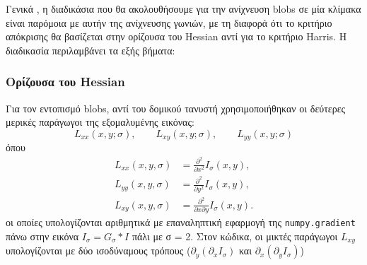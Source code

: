 \documentclass[12pt, a4paper]{article}
\begin{document}
Γενικά , η διαδικάσια που θα ακολουθήσουμε για την ανίχνευση blobs σε μία κλίμακα είναι παρόμοια με αυτήν της ανίχνευσης γωνιών, με τη διαφορά ότι το κριτήριο απόκρισης θα βασίζεται στην ορίζουσα του Hessian αντί για το κριτήριο Harris. Η διαδικασία περιλαμβάνει τα εξής βήματα:
\subsubsection{Ορίζουσα του Hessian}

Για τον εντοπισμό blobs, αντί του δομικού τανυστή χρησιμοποιήθηκαν οι δεύτερες
μερικές παράγωγοι της εξομαλυμένης εικόνας:
\begin{equation}
    L_{xx}(x,y;\sigma), \qquad
    L_{xy}(x,y;\sigma), \qquad
    L_{yy}(x,y;\sigma)
\end{equation} 
όπου \begin{equation}                                                                                                                                                            
  \begin{aligned}                                                                                                                                                             
  L_{xx}(x,y,\sigma) &= \frac{\partial^2}{\partial x^2} I_\sigma(x,y), \\                                                                                                     
  L_{yy}(x,y,\sigma) &= \frac{\partial^2}{\partial y^2} I_\sigma(x,y), \\                                                                                                     
  L_{xy}(x,y,\sigma) &= \frac{\partial^2}{\partial x \partial y} I_\sigma(x,y).                                                                                               
  \end{aligned}                                                                                                                                                               
  \label{eq:hessian_second_derivatives}                                                                                                                                       
  \end{equation}     
οι οποίες υπολογίζονται αριθμητικά με επαναληπτική εφαρμογή της
\texttt{numpy.gradient} πάνω στην εικόνα $I_\sigma = G_\sigma * I$ πάλι με σ = 2.  Στον κώδικα, οι μικτές παράγωγοι
$L_{xy}$ υπολογίζονται με δύο ισοδύναμους τρόπους
($\partial_y(\partial_x I_\sigma)$ και $\partial_x(\partial_y I_\sigma)$)
\end{document}
